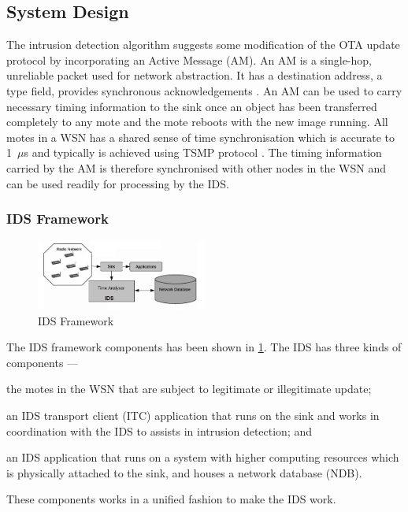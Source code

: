 \documentclass[conference,final]{IEEEtran}
\begin{document}
\subsection{System Design}
\label{subsec:sysdeg}




The intrusion detection algorithm suggests some modification of the OTA update protocol by incorporating an Active Message (AM).
An AM is a single-hop, unreliable packet used for network abstraction. 
It has a destination address, a type  field, provides synchronous acknowledgements \cite{tep116}. 
An AM can be used to carry necessary timing information to the sink once an object has been transferred completely to any mote and the mote reboots with the new image running.
All motes in a WSN has a shared sense of time synchronisation which is accurate to 1~$\mu$s  and typically is achieved using TSMP protocol \cite{Pister08tsmp:time}.
The timing information carried by the AM is therefore synchronised with other nodes in the WSN and can be used readily for processing by the IDS.

\subsubsection{IDS Framework}
\label{ssc:ids_fw}

\begin{figure}[btp]
    \centering
    \includegraphics[width=0.5\textwidth]{IDS_fw}	
    \caption{IDS Framework}
    \label{fig:ids_fw}
\end{figure}
The IDS framework components has been shown in \ref{fig:ids_fw}.
The IDS has three kinds of components --- 
\begin{inparaenum}
\item the motes in the WSN that are subject to legitimate or illegitimate update; 
\item an IDS transport client (ITC) application that runs on the sink and works in coordination with the IDS to assists in intrusion detection; and
\item an IDS application that runs on a system with higher computing resources which is physically attached to the sink, and houses a network database (NDB).
\end{inparaenum}
These components works in a unified fashion to make the IDS work.
\end{document}
